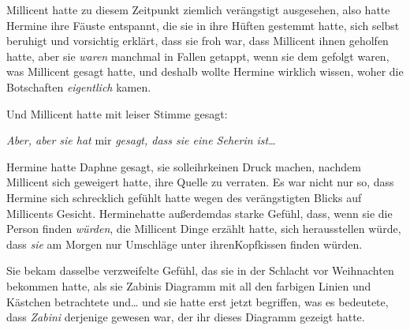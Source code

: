 Millicent hatte zu diesem Zeitpunkt ziemlich verängstigt ausgesehen, also hatte Hermine ihre Fäuste entspannt, die sie in ihre Hüften gestemmt hatte, sich selbst beruhigt und vorsichtig erklärt, dass sie froh war, dass Millicent ihnen geholfen hatte, aber sie \emph{waren} manchmal in Fallen getappt, wenn sie dem gefolgt waren, was Millicent gesagt hatte, und deshalb wollte Hermine wirklich wissen, woher die Botschaften \emph{eigentlich} kamen.

Und Millicent hatte mit leiser Stimme gesagt:

\emph{Aber, aber sie hat} mir \emph{gesagt, dass sie eine Seherin ist}…

Hermine hatte Daphne gesagt, sie solleihrkeinen Druck machen, nachdem Millicent sich geweigert hatte, ihre Quelle zu verraten. Es war nicht nur so, dass Hermine sich schrecklich gefühlt hatte wegen des verängstigten Blicks auf Millicents Gesicht. Herminehatte außerdemdas starke Gefühl, dass, wenn sie die Person finden \emph{würden}, die Millicent Dinge erzählt hatte, sich herausstellen würde, dass \emph{sie} am Morgen nur Umschläge unter ihrenKopfkissen finden würden.

Sie bekam dasselbe verzweifelte Gefühl, das sie in der Schlacht vor Weihnachten bekommen hatte, als sie Zabinis Diagramm mit all den farbigen Linien und Kästchen betrachtete und… und sie hatte erst jetzt begriffen, was es bedeutete, dass \emph{Zabini} derjenige gewesen war, der ihr dieses Diagramm gezeigt hatte.

